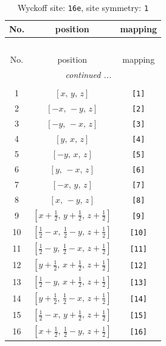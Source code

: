\documentclass[fleqn,8pt]{jsarticle}
\begin{document}
\begin{longtable}{ccc}
\caption{Wyckoff site: {\tt 16e}, site symmetry: {\tt 1}}
 \\
 \hline \hline
No. & position & mapping \\ \hline \endfirsthead

\multicolumn{2}{l}{\tablename\ \thetable{}} \\
 \hline \hline
No. & position & mapping \\ \hline \endhead

 \hline \hline
\multicolumn{2}{r}{\footnotesize\it continued ...} \\ \endfoot

 \hline \hline
\multicolumn{2}{r}{} \\ \endlastfoot

1 & $\left[ x,\, y,\, z \right]$ & {\tt [1]} \\ \hline
2 & $\left[ - x,\, - y,\, z \right]$ & {\tt [2]} \\ \hline
3 & $\left[ - y,\, - x,\, z \right]$ & {\tt [3]} \\ \hline
4 & $\left[ y,\, x,\, z \right]$ & {\tt [4]} \\ \hline
5 & $\left[ - y,\, x,\, z \right]$ & {\tt [5]} \\ \hline
6 & $\left[ y,\, - x,\, z \right]$ & {\tt [6]} \\ \hline
7 & $\left[ - x,\, y,\, z \right]$ & {\tt [7]} \\ \hline
8 & $\left[ x,\, - y,\, z \right]$ & {\tt [8]} \\ \hline
9 & $\left[ x + \frac{1}{2},\, y + \frac{1}{2},\, z + \frac{1}{2} \right]$ & {\tt [9]} \\ \hline
10 & $\left[ \frac{1}{2} - x,\, \frac{1}{2} - y,\, z + \frac{1}{2} \right]$ & {\tt [10]} \\ \hline
11 & $\left[ \frac{1}{2} - y,\, \frac{1}{2} - x,\, z + \frac{1}{2} \right]$ & {\tt [11]} \\ \hline
12 & $\left[ y + \frac{1}{2},\, x + \frac{1}{2},\, z + \frac{1}{2} \right]$ & {\tt [12]} \\ \hline
13 & $\left[ \frac{1}{2} - y,\, x + \frac{1}{2},\, z + \frac{1}{2} \right]$ & {\tt [13]} \\ \hline
14 & $\left[ y + \frac{1}{2},\, \frac{1}{2} - x,\, z + \frac{1}{2} \right]$ & {\tt [14]} \\ \hline
15 & $\left[ \frac{1}{2} - x,\, y + \frac{1}{2},\, z + \frac{1}{2} \right]$ & {\tt [15]} \\ \hline
16 & $\left[ x + \frac{1}{2},\, \frac{1}{2} - y,\, z + \frac{1}{2} \right]$ & {\tt [16]} \\
\end{longtable}
\end{document}
